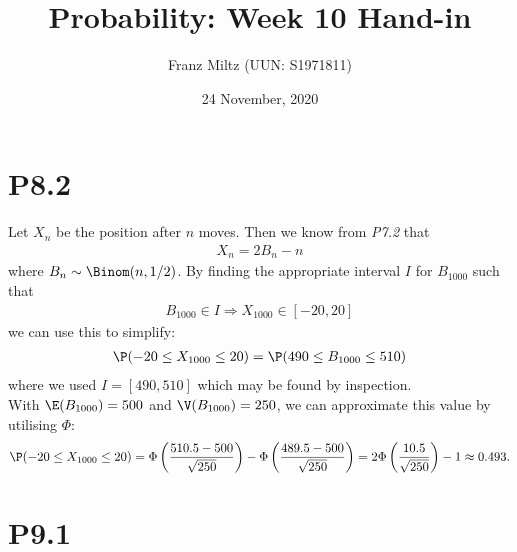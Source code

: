 \documentclass{article}
\begin{document}
\title{Probability: Week 10 Hand-in}
\author{Franz Miltz (UUN: S1971811)}
\date{24 November, 2020}
\maketitle

\section*{P8.2}

Let $X_n$ be the position after $n$ moves. Then we know from \emph{P7.2}
that
\begin{align*}
	X_n = 2B_n-n
\end{align*}
where $B_n\sim\Binom(n,1/2)$. By finding the appropriate interval $I$
for $B_{1000}$ such that
\begin{align*}
	B_{1000}\in I\Rightarrow X_{1000}\in [-20, 20]
\end{align*}
we can use this to simplify:
\begin{align*}
	\P(-20\leq X_{1000} \leq 20) = \P(490 \leq B_{1000} \leq 510)
\end{align*}
where we used $I=[490, 510]$ which may be found by inspection.\\
With $\E(B_{1000})=500$ and $\V(B_{1000})=250$, we can approximate this value
by utilising $\Phi$:
\begin{align*}
	\P(-20\leq X_{1000} \leq 20) = \Phi\left(\frac{510.5-500}{\sqrt{250}}\right)
	- \Phi\left(\frac{489.5-500}{\sqrt{250}}\right)
	= 2\Phi\left(\frac{10.5}{\sqrt{250}}\right)-1\approx 0.493.
\end{align*}

\section*{P9.1}
\end{document}
